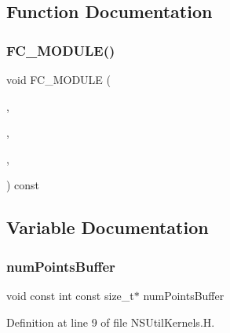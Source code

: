 \subsection{Function Documentation}
\hypertarget{NSUtilKernels_8H_a5abd4ece2d1e22d42d95512e3481c2c5}{}\label{NSUtilKernels_8H_a5abd4ece2d1e22d42d95512e3481c2c5} 
\subsubsection{\texorpdfstring{F\+C\+\_\+\+M\+O\+D\+U\+L\+E()}{FC\_MODULE()}}
{\footnotesize\ttfamily void F\+C\+\_\+\+M\+O\+D\+U\+LE (\begin{DoxyParamCaption}\item[{nsutil}]{,  }\item[{getpointstate}]{,  }\item[{N\+S\+U\+T\+IL}]{,  }\item[{G\+E\+T\+P\+O\+I\+N\+T\+S\+T\+A\+TE}]{ }\end{DoxyParamCaption}) const}



\subsection{Variable Documentation}
\hypertarget{NSUtilKernels_8H_a327d32e541f87642bcb2cfc01c2ffb5e}{}\label{NSUtilKernels_8H_a327d32e541f87642bcb2cfc01c2ffb5e} 
\subsubsection{\texorpdfstring{num\+Points\+Buffer}{numPointsBuffer}}
{\footnotesize\ttfamily void const int const size\+\_\+t$\ast$ num\+Points\+Buffer}



Definition at line 9 of file N\+S\+Util\+Kernels.\+H.

\hypertarget{NSUtilKernels_8H_a97281fed7ef85b53d74753fbc3367cd4}{}\label{NSUtilKernels_8H_a97281fed7ef85b53d74753fbc3367cd4} 
